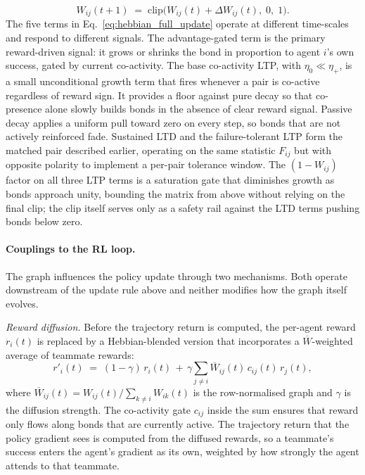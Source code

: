 \documentclass{article}
\theoremstyle{plain}
\theoremstyle{definition}
\theoremstyle{remark}
\begin{document}
\noindent
\[
W_{ij}(t+1) \;=\; \mathrm{clip}\!\big(W_{ij}(t) + \Delta W_{ij}(t),\; 0,\; 1\big).
\]
The five terms in Eq.~\eqref{eq:hebbian_full_update} operate at different
time-scales and respond to different signals. The advantage-gated term is
the primary reward-driven signal: it grows or shrinks the bond in
proportion to agent $i$'s own success, gated by current co-activity. The
base co-activity LTP, with $\eta_0 \ll \eta_+$, is a small unconditional
growth term that fires whenever a pair is co-active regardless of reward
sign. It provides a floor against pure decay so that co-presence alone
slowly builds bonds in the absence of clear reward signal. Passive decay
applies a uniform pull toward zero on every step, so bonds that are not
actively reinforced fade. Sustained LTD and the failure-tolerant LTP form the matched
pair described earlier, operating on the same statistic $F_{ij}$ but with
opposite polarity to implement a per-pair tolerance window. The
$(1 - W_{ij})$ factor on all three LTP terms is a saturation gate that
diminishes growth as bonds approach unity, bounding the matrix from above
without relying on the final clip; the clip itself serves only as a safety
rail against the LTD terms pushing bonds below zero.

\paragraph{Couplings to the RL loop.}
The graph influences the policy update through two mechanisms. Both operate downstream of the update rule above and neither modifies how the graph itself evolves.

\emph{Reward diffusion.} Before the trajectory return is computed, the per-agent reward $r_i(t)$ is replaced by a Hebbian-blended version that incorporates a $\overline{W}$-weighted average of teammate rewards:
\[
r'_i(t) \;=\; (1 - \gamma) \, r_i(t) \,+\, \gamma \sum_{j \neq i} \overline{W}_{ij}(t) \, c_{ij}(t) \, r_j(t),
\]
where $\overline{W}_{ij}(t) = W_{ij}(t) / \sum_{k \neq i} W_{ik}(t)$ is the row-normalised graph and $\gamma$ is the diffusion strength. The co-activity gate $c_{ij}$ inside the sum ensures that reward only flows along bonds that are currently active. The trajectory return that the policy gradient sees is computed from the diffused rewards, so a teammate's success enters the agent's gradient as its own, weighted by how strongly the agent attends to that teammate.
\end{document}
